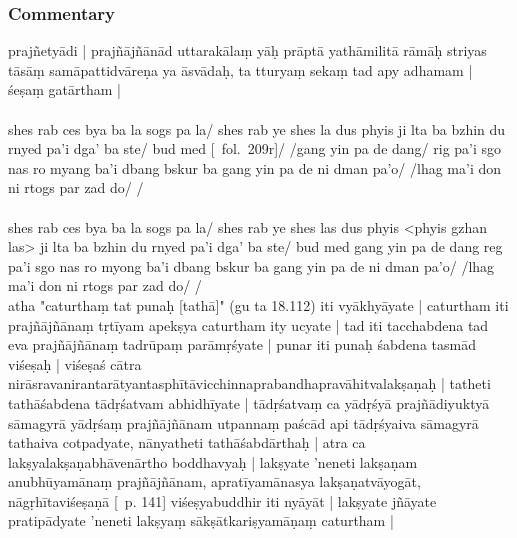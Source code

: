 \documentclass[12pt]{article}
\begin{document}
\subsubsection{Commentary}
prajñetyādi | prajñājñānād uttarakālaṃ yāḥ prāptā yathāmilitā rāmāḥ striyas tāsāṃ samāpattidvāreṇa ya āsvādaḥ, ta tturyaṃ sekaṃ tad apy adhamam | śeṣaṃ gatārtham |\\

\textbf{\TVA}\\
shes rab ces bya ba la sogs pa la/ shes rab ye shes la dus phyis ji lta ba bzhin du rnyed pa'i dga' ba ste/ bud med [\TVA\ fol.\ 209r]/ /gang yin pa de dang/ rig pa'i sgo nas ro myang ba'i dbang bskur ba gang yin pa de ni dman pa'o/ /lhag ma'i don ni rtogs par zad do/ /\\

\textbf{\TVB}\\
shes rab ces bya ba la sogs pa la/ shes rab ye shes las dus phyis <phyis gzhan las> ji lta ba bzhin du rnyed pa'i dga' ba ste/ bud med gang yin pa de dang reg pa'i sgo nas ro myong ba'i dbang bskur ba gang yin pa de ni dman pa'o/ /lhag ma'i don ni rtogs par zad do/ /\\

atha "caturthaṃ tat punaḥ [tathā]" (gu ta 18.112) iti vyākhyāyate | caturtham iti prajñājñānaṃ tṛtīyam apekṣya caturtham ity ucyate | tad iti tacchabdena tad eva prajñājñānaṃ tadrūpaṃ parāmṛśyate | punar iti punaḥ śabdena tasmād viśeṣaḥ | viśeṣaś cātra nirāsravanirantarātyantasphītāvicchinnaprabandhapravāhitvalakṣaṇaḥ | tatheti tathāśabdena tādṛśatvam abhidhīyate | tādṛśatvaṃ ca yādṛśyā prajñādiyuktyā sāmagyrā yādṛśaṃ prajñājñānam utpannaṃ paścād api tādṛśyaiva sāmagyrā tathaiva cotpadyate, nānyatheti tathāśabdārthaḥ | atra ca lakṣyalakṣaṇabhāvenārtho boddhavyaḥ | lakṣyate 'neneti lakṣaṇam anubhūyamānaṃ prajñājñānam, apratīyamānasya lakṣaṇatvāyogāt, nāgṛhītaviśeṣaṇā [\EDD\ p. 141] viśeṣyabuddhir iti nyāyāt | lakṣyate jñāyate pratipādyate 'neneti lakṣyaṃ sākṣātkariṣyamāṇaṃ caturtham |\\
\end{document}
